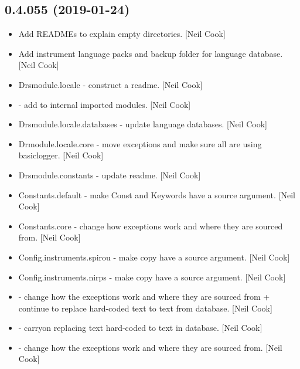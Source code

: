 \documentclass[a4paper,10pt,english]{report}
\begin{document}
\subsection{0.4.055 (2019-01-24)}
\label{\detokenize{misc/changelog:id209}}\begin{itemize}
\item {} 
Add READMEs to explain empty directories. {[}Neil Cook{]}

\item {} 
Add instrument language packs and backup folder for language database.
{[}Neil Cook{]}

\item {} 
Drsmodule.locale - construct a readme. {[}Neil Cook{]}

\item {} 
 - add  to internal imported
modules. {[}Neil Cook{]}

\item {} 
Drsmodule.locale.databases - update language databases. {[}Neil Cook{]}

\item {} 
Drmodule.locale.core - move exceptions and make sure all are using
basiclogger. {[}Neil Cook{]}

\item {} 
Drsmodule.constants - update readme. {[}Neil Cook{]}

\item {} 
Constants.default - make Const and Keywords have a source argument.
{[}Neil Cook{]}

\item {} 
Constants.core - change how exceptions work and where they are sourced
from. {[}Neil Cook{]}

\item {} 
Config.instruments.spirou - make copy have a source argument. {[}Neil
Cook{]}

\item {} 
Config.instruments.nirps - make copy have a source argument. {[}Neil
Cook{]}

\item {} 
 - change how the exceptions work and where they are
sourced from + continue to replace hard-coded text to text from
database. {[}Neil Cook{]}

\item {} 
 - carryon replacing text hard-coded to text in database.
{[}Neil Cook{]}

\item {} 
 - change how the exceptions work and where they are sourced
from. {[}Neil Cook{]}

\end{itemize}
\end{document}
